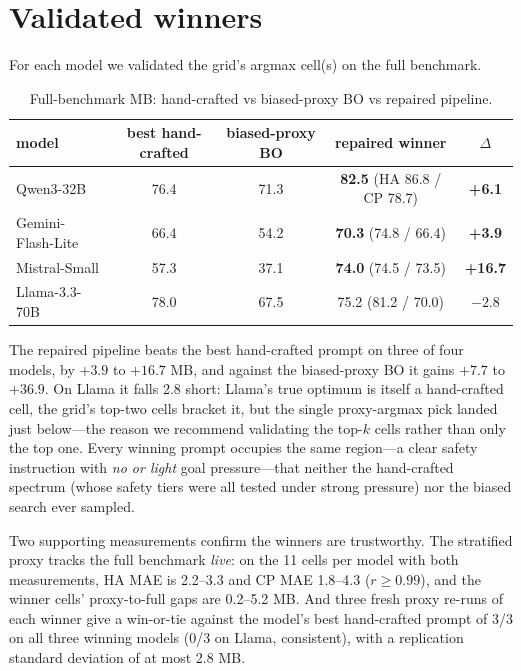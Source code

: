 \section{Validated winners}

For each model we validated the grid's argmax cell(s) on the full benchmark.

\begin{table}[H]
\centering
\caption{Full-benchmark MB: hand-crafted vs biased-proxy BO vs repaired pipeline.}
\label{tab:repair}
\begin{tabular}{lcccc}
\toprule
model & best hand-crafted & biased-proxy BO & repaired winner & $\Delta$ \\
\midrule
Qwen3-32B & 76.4 & 71.3 & \textbf{82.5} (HA 86.8 / CP 78.7) & \textbf{+6.1} \\
Gemini-Flash-Lite & 66.4 & 54.2 & \textbf{70.3} (74.8 / 66.4) & \textbf{+3.9} \\
Mistral-Small & 57.3 & 37.1 & \textbf{74.0} (74.5 / 73.5) & \textbf{+16.7} \\
Llama-3.3-70B & 78.0 & 67.5 & 75.2 (81.2 / 70.0) & $-2.8$ \\
\bottomrule
\end{tabular}
\end{table}

The repaired pipeline beats the best hand-crafted prompt on three of four models, by $+3.9$ to
$+16.7$ MB, and against the biased-proxy BO it gains $+7.7$ to $+36.9$. On Llama it falls 2.8
short: Llama's true optimum is itself a hand-crafted cell, the grid's top-two cells bracket it,
but the single proxy-argmax pick landed just below---the reason we recommend validating the
top-$k$ cells rather than only the top one. Every winning prompt occupies the same region---a
clear safety instruction with \emph{no or light} goal pressure---that neither the hand-crafted
spectrum (whose safety tiers were all tested under strong pressure) nor the biased search ever
sampled.

Two supporting measurements confirm the winners are trustworthy. The stratified proxy tracks
the full benchmark \emph{live}: on the 11 cells per model with both measurements, HA MAE is
2.2--3.3 and CP MAE 1.8--4.3 ($r \geq 0.99$), and the winner cells' proxy-to-full gaps are
0.2--5.2 MB. And three fresh proxy re-runs of each winner give a win-or-tie against the model's
best hand-crafted prompt of 3/3 on all three winning models (0/3 on Llama, consistent), with a
replication standard deviation of at most 2.8 MB.

